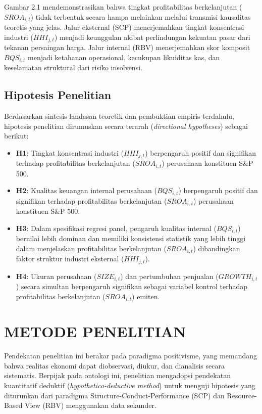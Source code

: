 \documentclass[12pt,a4paper]{article}
\providecommand{\tightlist}{%
  \setlength{\itemsep}{0pt}\setlength{\parskip}{0pt}%
}
\begin{document}
Gambar 2.1 mendemonstrasikan bahwa tingkat profitabilitas berkelanjutan
(\(SROA_{i,t}\)) tidak terbentuk secara hampa melainkan melalui
transmisi kausalitas teoretis yang jelas. Jalur eksternal (SCP)
menerjemahkan tingkat konsentrasi industri (\(HHI_{j,t}\)) menjadi
keunggulan akibat perlindungan kekuatan pasar dari tekanan persaingan
harga. Jalur internal (RBV) menerjemahkan skor komposit \(BQS_{i,t}\)
menjadi ketahanan operasional, kecukupan likuiditas kas, dan keselamatan
struktural dari risiko insolvensi.

\subsection{Hipotesis Penelitian}\label{hipotesis-penelitian}

Berdasarkan sintesis landasan teoretik dan pembuktian empiris terdahulu,
hipotesis penelitian dirumuskan secara terarah (\emph{directional
hypotheses}) sebagai berikut:

\begin{itemize}
\tightlist
\item
  \textbf{H1}: Tingkat konsentrasi industri (\(HHI_{j,t}\)) berpengaruh
  positif dan signifikan terhadap profitabilitas berkelanjutan
  (\(SROA_{i,t}\)) perusahaan konstituen S\&P 500.
\item
  \textbf{H2}: Kualitas keuangan internal perusahaan (\(BQS_{i,t}\))
  berpengaruh positif dan signifikan terhadap profitabilitas
  berkelanjutan (\(SROA_{i,t}\)) perusahaan konstituen S\&P 500.
\item
  \textbf{H3}: Dalam spesifikasi regresi panel, pengaruh kualitas
  internal (\(BQS_{i,t}\)) bernilai lebih dominan dan memiliki
  konsistensi statistik yang lebih tinggi dalam menjelaskan
  profitabilitas berkelanjutan (\(SROA_{i,t}\)) dibandingkan faktor
  struktur industri eksternal (\(HHI_{j,t}\)).
\item
  \textbf{H4}: Ukuran perusahaan (\(SIZE_{i,t}\)) dan pertumbuhan
  penjualan (\(GROWTH_{i,t}\)) secara simultan berpengaruh signifikan
  sebagai variabel kontrol terhadap profitabilitas berkelanjutan
  (\(SROA_{i,t}\)) emiten.
\end{itemize}

\section{METODE PENELITIAN}\label{metode-penelitian}

Pendekatan penelitian ini berakar pada paradigma positivisme, yang
memandang bahwa realitas ekonomi dapat diobservasi, diukur, dan
dianalisis secara sistematis. Berpijak pada ontologi ini, penelitian
mengadopsi pendekatan kuantitatif deduktif (\emph{hypothetico-deductive
method}) untuk menguji hipotesis yang diturunkan dari paradigma
Structure-Conduct-Performance (SCP) dan Resource-Based View (RBV)
menggunakan data sekunder.
\end{document}
